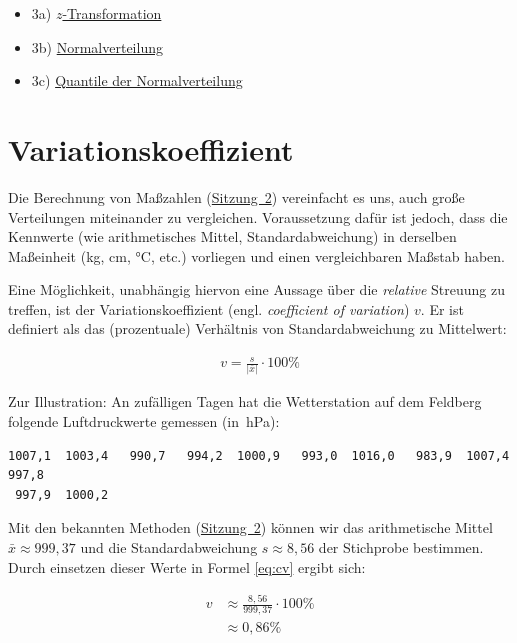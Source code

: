 \documentclass[
  11pt,
  ngerman,
  a4paper,
]{report}
\providecommand{\tightlist}{%
  \setlength{\itemsep}{0pt}\setlength{\parskip}{0pt}}
\begin{document}
\begin{itemize}
\tightlist
\item
  3a) \href{https://video01.uni-frankfurt.de/Mediasite/Play/8c755eed883b4ea0924481da818b742f1d}{\(z\)-Transformation}
\item
  3b) \href{https://video01.uni-frankfurt.de/Mediasite/Play/26e839cc0d8d43d2a74c2c03b76aa6421d}{Normalverteilung}
\item
  3c) \href{https://video01.uni-frankfurt.de/Mediasite/Play/902e68deb21045a79473a249303558d11d}{Quantile der Normalverteilung}
\end{itemize}

\hypertarget{variationskoeffizient}{%
\section{Variationskoeffizient}\label{variationskoeffizient}}

Die Berechnung von Maßzahlen (\protect\hyperlink{mauxdfzahlen}{Sitzung~2}) vereinfacht es uns, auch große Verteilungen miteinander zu vergleichen. Voraussetzung dafür ist jedoch, dass die Kennwerte (wie arithmetisches Mittel, Standardabweichung) in derselben Maßeinheit (kg, cm, °C, etc.) vorliegen und einen vergleichbaren Maßstab haben.

Eine Möglichkeit, unabhängig hiervon eine Aussage über die \emph{relative} Streuung zu treffen, ist der Variationskoeffizient (engl. \emph{coefficient of variation}) \(v\). Er ist definiert als das (prozentuale) Verhältnis von Standardabweichung zu Mittelwert:

\[\begin{aligned}
v=\frac{s}{|\bar{x}|}\cdot 100\%
\end{aligned}
\label{eq:cv}
\]

Zur Illustration: An zufälligen Tagen hat die Wetterstation auf dem Feldberg folgende Luftdruckwerte gemessen (in~hPa):

\begin{verbatim}
1007,1  1003,4   990,7   994,2  1000,9   993,0  1016,0   983,9  1007,4   997,8  
 997,9  1000,2
\end{verbatim}

Mit den bekannten Methoden (\protect\hyperlink{mauxdfzahlen}{Sitzung~2}) können wir das arithmetische Mittel \(\bar{x}\approx 999,37\) und die Standardabweichung \(s\approx8,56\) der Stichprobe bestimmen. Durch einsetzen dieser Werte in Formel \eqref{eq:cv} ergibt sich:

\[\begin{aligned}
v&\approx\frac{8{,}56}{999{,}37}\cdot 100\%\\[4pt]
 &\approx0{,}86\%
\end{aligned}
\]
\end{document}
